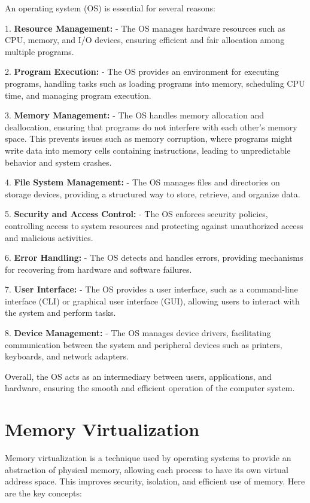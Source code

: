 \documentclass{report}
\begin{document}
An operating system (OS) is essential for several reasons:

1. \textbf{Resource Management:}
- The OS manages hardware resources such as CPU, memory, and I/O devices, ensuring efficient and fair allocation among multiple programs.

2. \textbf{Program Execution:}
- The OS provides an environment for executing programs, handling tasks such as loading programs into memory, scheduling CPU time, and managing program execution.

3. \textbf{Memory Management:}
- The OS handles memory allocation and deallocation, ensuring that programs do not interfere with each other's memory space. This prevents issues such as memory corruption, where programs might write data into memory cells containing instructions, leading to unpredictable behavior and system crashes.

4. \textbf{File System Management:}
- The OS manages files and directories on storage devices, providing a structured way to store, retrieve, and organize data.

5. \textbf{Security and Access Control:}
- The OS enforces security policies, controlling access to system resources and protecting against unauthorized access and malicious activities.

6. \textbf{Error Handling:}
- The OS detects and handles errors, providing mechanisms for recovering from hardware and software failures.

7. \textbf{User Interface:}
- The OS provides a user interface, such as a command-line interface (CLI) or graphical user interface (GUI), allowing users to interact with the system and perform tasks.

8. \textbf{Device Management:}
- The OS manages device drivers, facilitating communication between the system and peripheral devices such as printers, keyboards, and network adapters.

Overall, the OS acts as an intermediary between users, applications, and hardware, ensuring the smooth and efficient operation of the computer system.

\section{Memory Virtualization}

Memory virtualization is a technique used by operating systems to provide an abstraction of physical memory, allowing each process to have its own virtual address space. This improves security, isolation, and efficient use of memory. Here are the key concepts:
\end{document}

